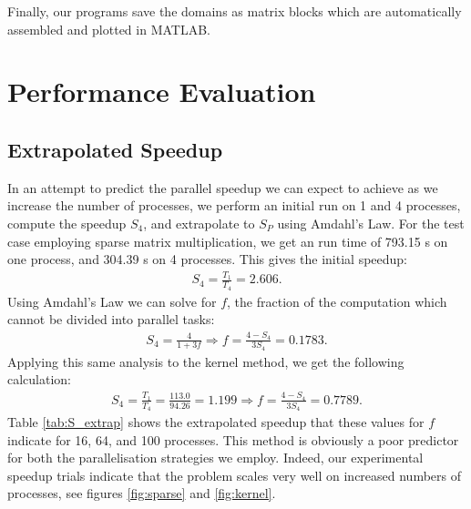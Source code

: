 \documentclass[a4paper,11pt]{article}
\newcommand{\ba}[1]{\begin{align*}    #1    \end{align*}}
\renewcommand{\vec}[1]{\mathbf{#1}}
\begin{document}
Finally, our programs save the domains as matrix blocks which are automatically assembled and plotted in MATLAB.



\section*{Performance Evaluation}
\subsection*{Extrapolated Speedup}
In an attempt to predict the parallel speedup we can expect to achieve as we increase the number of processes, we perform an initial run on 1 and 4 processes, compute the speedup $S_4$, and extrapolate to $S_P$ using Amdahl's Law.  For the test case employing sparse matrix multiplication, we get an run time of 793.15 s on one process, and 304.39 s on 4 processes.  This gives the initial speedup:
\ba{
S_4 = \frac{T_1}{T_4} = 2.606.
}
Using Amdahl's Law we can solve for $f$, the fraction of the computation which cannot be divided into parallel tasks:
\ba{
S_4 = \frac{4}{1+3f} \Rightarrow f = \frac{4-S_4}{3S_4} = 0.1783.
}
Applying this same analysis to the kernel method, we get the following calculation:
\ba{
S_4 = \frac{T_1}{T_4} = \frac{113.0}{94.26} =  1.199 \Rightarrow f = \frac{4-S_4}{3S_4} = 0.7789.
}
Table \ref{tab:S_extrap} shows the extrapolated speedup that these values for $f$ indicate for 16, 64, and 100 processes.  This method is obviously a poor predictor for both the parallelisation strategies we employ.  Indeed, our experimental speedup trials indicate that the problem scales very well on increased numbers of processes, see figures \ref{fig:sparse} and \ref{fig:kernel}.
\end{document}
